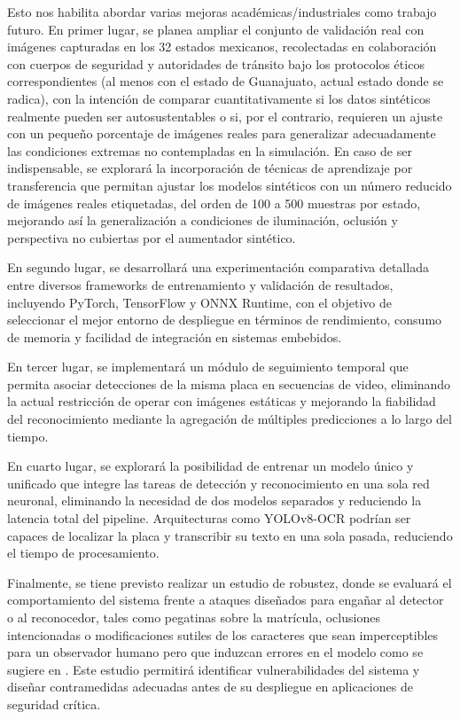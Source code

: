 Esto nos habilita abordar varias mejoras académicas/industriales como trabajo futuro. En primer lugar, se planea ampliar el conjunto de validación real con imágenes capturadas en los 32 estados mexicanos, recolectadas en colaboración con cuerpos de seguridad y autoridades de tránsito bajo los protocolos éticos correspondientes (al menos con el estado de Guanajuato, actual estado donde se radica), con la intención de comparar cuantitativamente si los datos sintéticos realmente pueden ser autosustentables o si, por el contrario, requieren un ajuste con un pequeño porcentaje de imágenes reales para generalizar adecuadamente las condiciones extremas no contempladas en la simulación. En caso de ser indispensable, se explorará la incorporación de técnicas de aprendizaje por transferencia que permitan ajustar los modelos sintéticos con un número reducido de imágenes reales etiquetadas, del orden de 100 a 500 muestras por estado, mejorando así la generalización a condiciones de iluminación, oclusión y perspectiva no cubiertas por el aumentador sintético.

En segundo lugar, se desarrollará una experimentación comparativa detallada entre diversos frameworks de entrenamiento y validación de resultados, incluyendo PyTorch, TensorFlow y ONNX Runtime, con el objetivo de seleccionar el mejor entorno de despliegue en términos de rendimiento, consumo de memoria y facilidad de integración en sistemas embebidos.

En tercer lugar, se implementará un módulo de seguimiento temporal que permita asociar detecciones de la misma placa en secuencias de video, eliminando la actual restricción de operar con imágenes estáticas y mejorando la fiabilidad del reconocimiento mediante la agregación de múltiples predicciones a lo largo del tiempo.

En cuarto lugar, se explorará la posibilidad de entrenar un modelo único y unificado que integre las tareas de detección y reconocimiento en una sola red neuronal, eliminando la necesidad de dos modelos separados y reduciendo la latencia total del pipeline. Arquitecturas como YOLOv8-OCR podrían ser capaces de localizar la placa y transcribir su texto en una sola pasada, reduciendo el tiempo de procesamiento.

Finalmente, se tiene previsto realizar un estudio de robustez, donde se evaluará el comportamiento del sistema frente a ataques diseñados para engañar al detector o al reconocedor, tales como pegatinas sobre la matrícula, oclusiones intencionadas o modificaciones sutiles de los caracteres que sean imperceptibles para un observador humano pero que induzcan errores en el modelo como se sugiere en \cite{xiao-yan2023}. Este estudio permitirá identificar vulnerabilidades del sistema y diseñar contramedidas adecuadas antes de su despliegue en aplicaciones de seguridad crítica.
\newpage